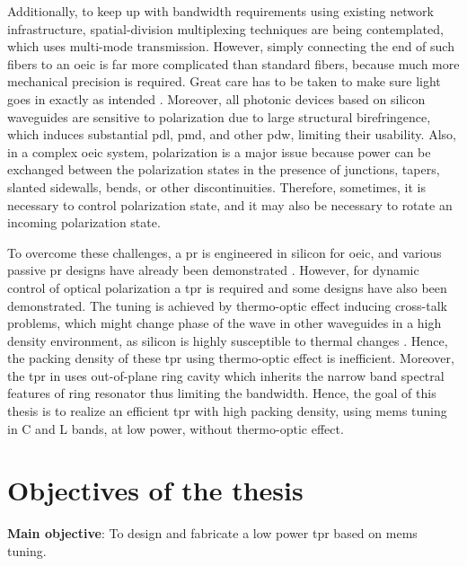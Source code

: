 \documentclass[../report.tex]{subfiles}
\begin{document}
Additionally, to keep up with bandwidth requirements using existing network infrastructure, spatial-division multiplexing techniques \cite{space_richardson_2013} are being contemplated, which uses multi-mode transmission. However, simply connecting the end of such fibers to an \gls{oeic} is far more complicated than standard fibers, because much more mechanical precision is required. Great care has to be taken to make sure light goes in exactly as intended \cite{hecht_is_2016}. Moreover, all photonic devices based on silicon waveguides are sensitive to polarization due to large structural birefringence, which induces substantial \gls{pdl}, \gls{pmd}, and other \gls{pdw}, limiting their usability. Also, in a complex \gls{oeic} system, polarization is a major issue because power can be exchanged between the polarization states in the presence of junctions, tapers, slanted sidewalls, bends, or other discontinuities. Therefore, sometimes, it is necessary to control polarization state, and it may also be necessary to rotate an incoming polarization state. \par

To overcome these challenges, a \gls{pr} is engineered in silicon for \gls{oeic}, and various passive \gls{pr} designs have already been demonstrated \cite{xie_efficient_2015,velasco_ultracompact_2012,leung_numerical_2011,wang_design_2014,dai_novel_2011,wirth_efficient_2012,chen_compact_2011}. However, for dynamic control of optical polarization a \gls{tpr} is required and some designs \cite{sarmiento-merenguel_demonstration_2015, xu_electrically_2014} have also been demonstrated. The tuning is achieved by thermo-optic effect inducing cross-talk problems, which might change phase of the wave in other waveguides in a high density environment, as silicon is highly susceptible to thermal changes \cite{ibrahim_athermal_2012}. Hence, the packing density of these \gls{tpr} using thermo-optic effect is inefficient. Moreover, the \gls{tpr} in \cite{ xu_electrically_2014} uses out-of-plane ring cavity which inherits the narrow band spectral features of ring resonator thus limiting the bandwidth. Hence, the goal of this thesis is to realize an efficient \gls{tpr} with high packing density, using \gls{mems} tuning in C and L bands, at low power, without thermo-optic effect.

	\section{Objectives of the thesis}
\textbf{Main objective}: To design and fabricate a low power \gls{tpr} based on \gls{mems} tuning. \\
\end{document}
